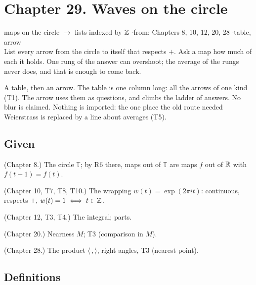 \newpage

\section*{Chapter 29. Waves on the circle}
\begin{center}
{\normalsize maps on the circle $\to$ lists indexed by $\mathbb{Z}$ \quad$\cdot$\quad from: Chapters 8, 10, 12, 20, 28 \quad$\cdot$\quad table, arrow}\\[4pt]
{\small List every arrow from the circle to itself that respects $+$. Ask a map how much of each it holds. One rung of the answer can overshoot; the average of the rungs never does, and that is enough to come back.}
\end{center}

A table, then an arrow. The table is one column long: all the arrows of one kind (T1). The arrow uses them as questions, and climbs the ladder of answers. No blur is claimed. Nothing is imported: the one place the old route needed Weierstrass is replaced by a line about averages (T5).

\subsection*{Given}

\begin{lines}
\item[\lab{G1}] (Chapter 8.) The circle $\mathbb{T}$; by R6 there, maps out of $\mathbb{T}$ are maps $f$ out of $\mathbb{R}$ with $f(t + 1) = f(t)$.
\item[\lab{G2}] (Chapter 10, T7, T8, T10.) The wrapping $w(t) = \exp(2\pi i t)$: continuous, respects $+$, $w(t) = 1 \iff t \in \mathbb{Z}$.
\item[\lab{G3}] (Chapter 12, T3, T4.) The integral; parts.
\item[\lab{G4}] (Chapter 20.) Nearness $M$; T3 (comparison in $M$).
\item[\lab{G5}] (Chapter 28.) The product $\langle\,,\rangle$, right angles, T3 (nearest point).
\end{lines}

\subsection*{Definitions}

